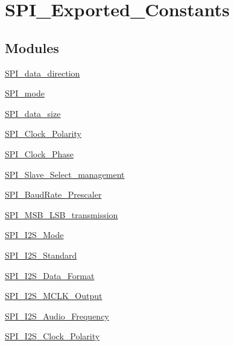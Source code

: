 \hypertarget{group___s_p_i___exported___constants}{}\section{S\+P\+I\+\_\+\+Exported\+\_\+\+Constants}
\label{group___s_p_i___exported___constants}
\subsection*{Modules}
\begin{DoxyCompactItemize}
\item 
\mbox{\hyperlink{group___s_p_i__data__direction}{S\+P\+I\+\_\+data\+\_\+direction}}
\item 
\mbox{\hyperlink{group___s_p_i__mode}{S\+P\+I\+\_\+mode}}
\item 
\mbox{\hyperlink{group___s_p_i__data__size}{S\+P\+I\+\_\+data\+\_\+size}}
\item 
\mbox{\hyperlink{group___s_p_i___clock___polarity}{S\+P\+I\+\_\+\+Clock\+\_\+\+Polarity}}
\item 
\mbox{\hyperlink{group___s_p_i___clock___phase}{S\+P\+I\+\_\+\+Clock\+\_\+\+Phase}}
\item 
\mbox{\hyperlink{group___s_p_i___slave___select__management}{S\+P\+I\+\_\+\+Slave\+\_\+\+Select\+\_\+management}}
\item 
\mbox{\hyperlink{group___s_p_i___baud_rate___prescaler}{S\+P\+I\+\_\+\+Baud\+Rate\+\_\+\+Prescaler}}
\item 
\mbox{\hyperlink{group___s_p_i___m_s_b___l_s_b__transmission}{S\+P\+I\+\_\+\+M\+S\+B\+\_\+\+L\+S\+B\+\_\+transmission}}
\item 
\mbox{\hyperlink{group___s_p_i___i2_s___mode}{S\+P\+I\+\_\+\+I2\+S\+\_\+\+Mode}}
\item 
\mbox{\hyperlink{group___s_p_i___i2_s___standard}{S\+P\+I\+\_\+\+I2\+S\+\_\+\+Standard}}
\item 
\mbox{\hyperlink{group___s_p_i___i2_s___data___format}{S\+P\+I\+\_\+\+I2\+S\+\_\+\+Data\+\_\+\+Format}}
\item 
\mbox{\hyperlink{group___s_p_i___i2_s___m_c_l_k___output}{S\+P\+I\+\_\+\+I2\+S\+\_\+\+M\+C\+L\+K\+\_\+\+Output}}
\item 
\mbox{\hyperlink{group___s_p_i___i2_s___audio___frequency}{S\+P\+I\+\_\+\+I2\+S\+\_\+\+Audio\+\_\+\+Frequency}}
\item 
\mbox{\hyperlink{group___s_p_i___i2_s___clock___polarity}{S\+P\+I\+\_\+\+I2\+S\+\_\+\+Clock\+\_\+\+Polarity}}

\end{DoxyCompactItemize}

